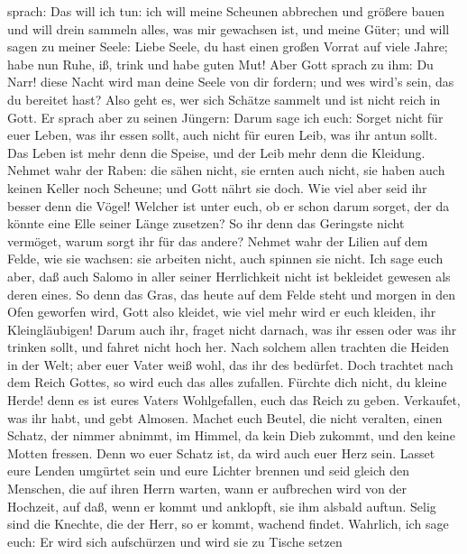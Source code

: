 sprach: Das will ich tun: ich will meine Scheunen abbrechen und größere
bauen und will drein sammeln alles, was mir gewachsen ist, und meine
Güter;  und will sagen zu meiner Seele: Liebe Seele, du
hast einen großen Vorrat auf viele Jahre; habe nun Ruhe, iß, trink und
habe guten Mut!  Aber Gott sprach zu ihm: Du Narr! diese
Nacht wird man deine Seele von dir fordern; und wes wird's sein, das du
bereitet hast?  Also geht es, wer sich Schätze sammelt und
ist nicht reich in Gott.  Er sprach aber zu seinen Jüngern:
Darum sage ich euch: Sorget nicht für euer Leben, was ihr essen sollt,
auch nicht für euren Leib, was ihr antun sollt.  Das Leben
ist mehr denn die Speise, und der Leib mehr denn die Kleidung.
 Nehmet wahr der Raben: die sähen nicht, sie ernten auch
nicht, sie haben auch keinen Keller noch Scheune; und Gott nährt sie
doch. Wie viel aber seid ihr besser denn die Vögel! 
Welcher ist unter euch, ob er schon darum sorget, der da könnte eine
Elle seiner Länge zusetzen?  So ihr denn das Geringste
nicht vermöget, warum sorgt ihr für das andere?  Nehmet
wahr der Lilien auf dem Felde, wie sie wachsen: sie arbeiten nicht, auch
spinnen sie nicht. Ich sage euch aber, daß auch Salomo in aller seiner
Herrlichkeit nicht ist bekleidet gewesen als deren eines. 
So denn das Gras, das heute auf dem Felde steht und morgen in den Ofen
geworfen wird, Gott also kleidet, wie viel mehr wird er euch kleiden,
ihr Kleingläubigen!  Darum auch ihr, fraget nicht darnach,
was ihr essen oder was ihr trinken sollt, und fahret nicht hoch her.
 Nach solchem allen trachten die Heiden in der Welt; aber
euer Vater weiß wohl, das ihr des bedürfet.  Doch trachtet
nach dem Reich Gottes, so wird euch das alles zufallen. 
Fürchte dich nicht, du kleine Herde! denn es ist eures Vaters
Wohlgefallen, euch das Reich zu geben.  Verkaufet, was ihr
habt, und gebt Almosen. Machet euch Beutel, die nicht veralten, einen
Schatz, der nimmer abnimmt, im Himmel, da kein Dieb zukommt, und den
keine Motten fressen.  Denn wo euer Schatz ist, da wird
auch euer Herz sein.  Lasset eure Lenden umgürtet sein und
eure Lichter brennen  und seid gleich den Menschen, die auf
ihren Herrn warten, wann er aufbrechen wird von der Hochzeit, auf daß,
wenn er kommt und anklopft, sie ihm alsbald auftun.  Selig
sind die Knechte, die der Herr, so er kommt, wachend findet. Wahrlich,
ich sage euch: Er wird sich aufschürzen und wird sie zu Tische setzen
